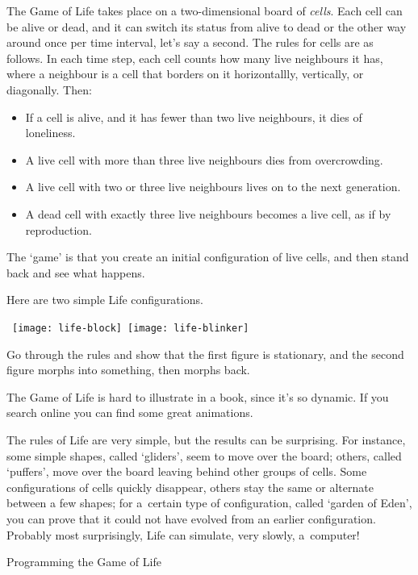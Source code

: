 The Game of Life takes place on
a two-dimensional board of \emph{cells}. Each cell can be
alive or dead, and it can switch its status from alive to dead
or the other way around once per time interval, let's say a second.
The rules for cells are as follows. In each time step, each cell
counts how many live neighbours it has, where a neighbour is a cell
that borders on it horizontallly, vertically, or diagonally. Then:
\begin{itemize}
\item If a cell is alive, and it has fewer than two live neighbours, it dies of loneliness.
\item A live cell with more than three live neighbours dies from overcrowding.
\item A live cell with two or three live neighbours lives on to the next generation.
\item A dead cell with exactly three live neighbours becomes a live cell, as if by reproduction.
\end{itemize}
The `game' is that you create an initial configuration of live cells, and then
stand back and see what happens. 
\begin{exercise}
  Here are two simple Life configurations.

  \ \hbox{\texttt{[image: life-block]} \texttt{[image: life-blinker]}}
  
  Go through the rules and show that the first figure is stationary,
  and the second figure morphs into something, then morphs back.
\end{exercise}
The Game of Life is hard to illustrate in a book, since it's so dynamic.
If you search online you can find some great animations.

The rules of Life are very simple, but the results can be surprising. For
instance, some simple shapes, called `gliders', seem to move over the
board; others, called `puffers', move over the board leaving behind
other groups of cells. Some configurations of cells quickly disappear,
others stay the same or alternate between a few shapes; for a~certain
type of configuration, called `garden of Eden', you can prove that it
could not have evolved from an earlier configuration. Probably most
surprisingly, Life can simulate, very slowly, a~computer!

 {Programming the Game of Life}

